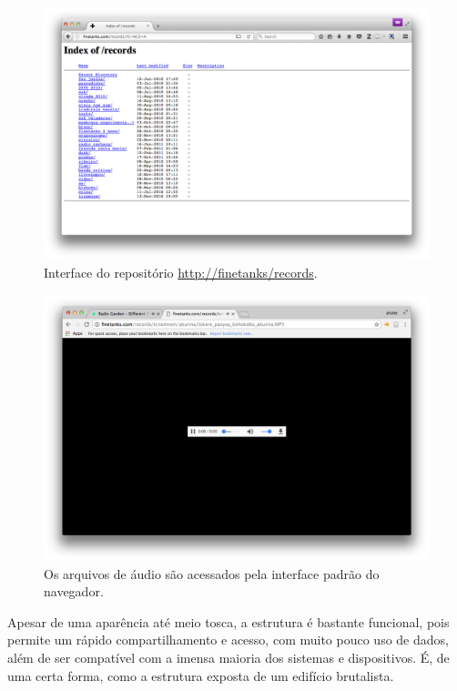 \begin{figure}

\includegraphics[width=1\textwidth]{pictures/cap1/finetanksrecords}
\caption{Interface do repositório \url{http://finetanks/records}.}
\label{fig:finetanksrecords}
\end{figure}


\begin{figure}

\includegraphics[width=1\textwidth]{pictures/cap1/finetanksmp3}
\caption{Os arquivos de áudio são acessados pela interface padrão do navegador.}
\label{fig:finetanksmp3}
\end{figure}

Apesar de uma aparência até meio tosca, a estrutura é bastante funcional, pois permite um rápido compartilhamento e acesso, com muito pouco uso de dados, além de ser compatível com a imensa maioria dos sistemas e dispositivos. É, de uma certa forma, como a estrutura exposta de um edifício brutalista. %

